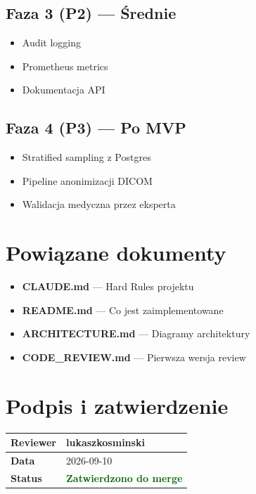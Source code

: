\documentclass[a4paper,12pt]{article}
\begin{document}
\subsection{Faza 3 (P2) — Średnie}

\begin{itemize}
    \item[$\square$] Audit logging
    \item[$\square$] Prometheus metrics
    \item[$\square$] Dokumentacja API
\end{itemize}

\subsection{Faza 4 (P3) — Po MVP}

\begin{itemize}
    \item[$\square$] Stratified sampling z Postgres
    \item[$\square$] Pipeline anonimizacji DICOM
    \item[$\square$] Walidacja medyczna przez eksperta
\end{itemize}

\section{Powiązane dokumenty}

\begin{itemize}
    \item \textbf{CLAUDE.md} — Hard Rules projektu
    \item \textbf{README.md} — Co jest zaimplementowane
    \item \textbf{ARCHITECTURE.md} — Diagramy architektury
    \item \textbf{CODE\_REVIEW.md} — Pierwsza wersja review
\end{itemize}

\section{Podpis i zatwierdzenie}

\begin{center}
\begin{tabularx}{\textwidth}{|l|X|}
\hline
\textbf{Reviewer} & lukaszkosminski \\
\hline
\textbf{Data} & 2026-09-10 \\
\hline
\textbf{Status} & \textcolor{darkgreen}{\textbf{Zatwierdzono do merge}} \\
\hline
\end{tabularx}
\end{center}
\end{document}
